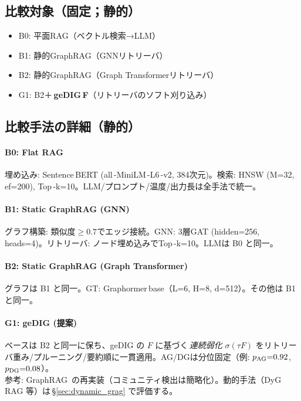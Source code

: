 \documentclass[ja=standard,xelatex]{bxjsarticle}
\begin{document}
\subsection{比較対象（固定；静的）}
\label{sec:rag_baselines}
\begin{itemize}[leftmargin=1.6em]
  \item B0: 平面RAG（ベクトル検索→LLM）
  \item B1: 静的GraphRAG（GNNリトリーバ）
  \item B2: 静的GraphRAG（Graph Transformerリトリーバ）
  \item G1: B2＋\,\textbf{geDIG\,F}（リトリーバのソフト刈り込み）
\end{itemize}

\subsection{比較手法の詳細（静的）}\label{sec:rag_methods_detail}
\paragraph{B0: Flat RAG}\; 埋め込み: Sentence\,BERT (all\,\mbox{-}MiniLM\,\mbox{-}L6\,\mbox{-}v2, 384次元)。検索: HNSW (M=32, ef=200), Top\,\mbox{-}k=10。LLM/プロンプト/温度/出力長は全手法で統一。\\
\paragraph{B1: Static GraphRAG (GNN)}\; グラフ構築: 類似度$\ge0.7$でエッジ接続。GNN: 3層GAT (hidden=256, heads=4)。リトリーバ: ノード埋め込みでTop\,\mbox{-}k=10。LLMは B0 と同一。\\
\paragraph{B2: Static GraphRAG (Graph Transformer)}\; グラフは B1 と同一。GT: Graphormer\,base（L=6, H=8, d=512）。その他は B1 と同一。\\
\paragraph{G1: geDIG (提案)}\; ベースは B2 と同一に保ち、geDIG の $F$ に基づく\,\emph{連続弱化} $\sigma(\tau F)$ をリトリーバ重み/プルーニング/要約順に一貫適用。AG/DGは分位固定（例: $p_{\rm AG}{=}0.92$, $p_{\rm DG}{=}0.08$）。\\
\noindent 参考: GraphRAG\,\cite{graphrag2024} の再実装（コミュニティ検出は簡略化）。動的手法（DyG\,RAG 等）は\,\S\ref{sec:dynamic_grag} で評価する。
\end{document}
